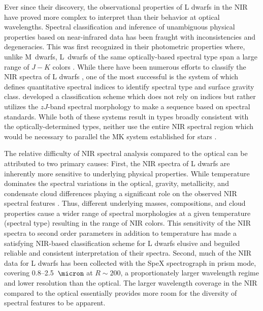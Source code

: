 \documentclass[12pt,preprint]{aastex}
\begin{document}
Ever since their discovery, the observational properties of L dwarfs in the NIR have proved more complex to interpret than their behavior at optical wavelengths.
Spectral classification and inference of unambiguous physical properties based on near-infrared data has been fraught with inconsistencies and degeneracies.
This was first recognized in their photometric properties where, unlike M~dwarfs, L~dwarfs of the same optically-based spectral type span a large range of $J-K$ colors \citep[e.g.,][]{Leggett:2003tm}. 
While there have been numerous efforts to classify the NIR spectra of L dwarfs \citep{Reid01_NIR, Testi01, Geballe02}, one of the most successful is the system of \citet{Allers:2013hk} which defines quantitative spectral indices to identify spectral type and surface gravity class.
\citet{Kirkpatrick10} developed a classification scheme which does not rely on indices but rather utilizes the $zJ$-band spectral morphology to make a sequence based on spectral standards.
While both of these systems result in types broadly consistent with the optically-determined types, neither use the entire NIR spectral region which would be necessary to parallel the MK system established for stars \citep{Morgan:1984wy,Kirkpatrick05}.

The relative difficulty of NIR spectral analysis compared to the optical can be attributed to two primary causes:
First, the NIR spectra of L dwarfs are inherently more sensitive to underlying physical properties.
While temperature dominates the spectral variations in the optical, gravity, metallicity, and condensate cloud differences playing a significant role on the observed NIR spectral features \citep{Knapp04}.
Thus, different underlying masses, compositions, and cloud properties cause a wider range of spectral morphologies at a given temperature (spectral type) resulting in the range of NIR colors.
This sensitivity of the NIR spectra to second order parameters in addition to temperature has made a satisfying NIR-based classification scheme for L dwarfs elusive and beguiled reliable and consistent interpretation of their spectra.
Second, much of the NIR data for L dwarfs has been collected with the SpeX spectrograph in prism mode, covering 0.8--2.5~$\micron$ at $R\sim200$, a proportionately larger wavelength regime and lower resolution than the optical.
The larger wavelength coverage in the NIR compared to the optical essentially provides more room for the diversity of spectral features to be apparent.
\end{document}
